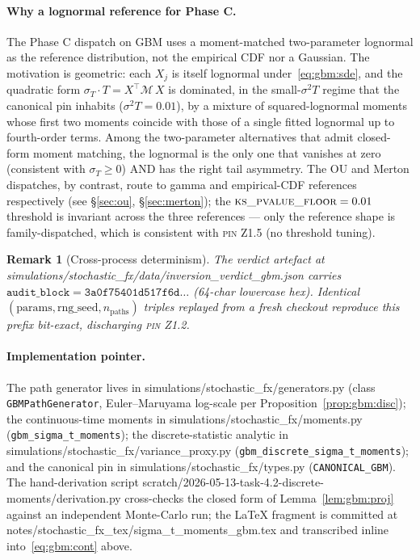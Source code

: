\documentclass[11pt,letterpaper]{article}
\newtheorem{remark}{Remark}[section]
\newcommand{\sigmaT}{\sigma_{T}}
\newcommand{\centerProj}{\mathcal{M}}
\newcommand{\PinZ}[1]{\textsc{pin Z1.#1}}
\begin{document}
\paragraph{Why a lognormal reference for Phase C.}
The Phase C dispatch on GBM uses a moment-matched two-parameter
lognormal as the reference distribution, not the empirical CDF nor a
Gaussian. The motivation is geometric: each $X_{j}$ is itself
lognormal under~\eqref{eq:gbm:sde}, and the quadratic form
$\sigmaT \cdot T = X^{\top}\centerProj\,X$ is dominated, in the
small-$\sigma^{2}T$ regime that the canonical pin inhabits
($\sigma^{2}T = 0.01$), by a mixture of squared-lognormal moments
whose first two moments coincide with those of a single fitted
lognormal up to fourth-order terms. Among the two-parameter
alternatives that admit closed-form moment matching, the lognormal
is the only one that vanishes at zero (consistent with
$\sigmaT \geq 0$) AND has the right tail asymmetry. The OU and
Merton dispatches, by contrast, route to gamma and empirical-CDF
references respectively (see \S\ref{sec:ou}, \S\ref{sec:merton}); the
$\textsc{ks\_pvalue\_floor} = 0.01$ threshold is invariant across the
three references — only the reference shape is family-dispatched,
which is consistent with \PinZ{5} (no threshold tuning).

\begin{remark}[Cross-process determinism]
\label{rem:gbm:audit}
The verdict artefact at
\textsf{simulations/stochastic\_fx/data/inversion\_verdict\_gbm.json}
carries
\(
    \texttt{audit\_block} = \texttt{3a0f75401d517f6d}\ldots
\)
(64-char lowercase hex). Identical
$(\text{params}, \text{rng\_seed}, n_{\text{paths}})$ triples replayed
from a fresh checkout reproduce this prefix bit-exact, discharging
\PinZ{2}.
\end{remark}

\paragraph{Implementation pointer.}
The path generator lives in
\textsf{simulations/stochastic\_fx/generators.py}
(class \texttt{GBMPathGenerator}, Euler--Maruyama log-scale per
Proposition~\ref{prop:gbm:disc}); the continuous-time moments
in \textsf{simulations/stochastic\_fx/moments.py}
(\texttt{gbm\_sigma\_t\_moments}); the discrete-statistic analytic
in \textsf{simulations/stochastic\_fx/variance\_proxy.py}
(\texttt{gbm\_discrete\_sigma\_t\_moments}); and the canonical pin in
\textsf{simulations/stochastic\_fx/types.py}
(\texttt{CANONICAL\_GBM}). The hand-derivation script
\textsf{scratch/2026-05-13-task-4.2-discrete-moments/derivation.py}
cross-checks the closed form of Lemma~\ref{lem:gbm:proj} against an
independent Monte-Carlo run; the LaTeX fragment is committed at
\textsf{notes/stochastic\_fx\_tex/sigma\_t\_moments\_gbm.tex} and
transcribed inline into~\eqref{eq:gbm:cont} above.
\end{document}
